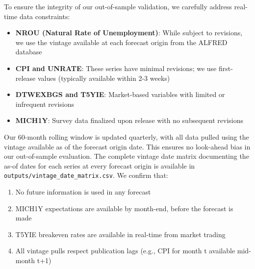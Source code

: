 \documentclass[12pt]{article}
\begin{document}
To ensure the integrity of our out-of-sample validation, we carefully address real-time data constraints:

\begin{itemize}
\item \textbf{NROU (Natural Rate of Unemployment)}: While subject to revisions, we use the vintage available at each forecast origin from the ALFRED database
\item \textbf{CPI and UNRATE}: These series have minimal revisions; we use first-release values (typically available within 2-3 weeks)
\item \textbf{DTWEXBGS and T5YIE}: Market-based variables with limited or infrequent revisions
\item \textbf{MICH1Y}: Survey data finalized upon release with no subsequent revisions
\end{itemize}

Our 60-month rolling window is updated quarterly, with all data pulled using the vintage available as of the forecast origin date. This ensures no look-ahead bias in our out-of-sample evaluation. The complete vintage date matrix documenting the as-of dates for each series at every forecast origin is available in \texttt{outputs/vintage\_date\_matrix.csv}. We confirm that:
\begin{enumerate}
\item No future information is used in any forecast
\item MICH1Y expectations are available by month-end, before the forecast is made
\item T5YIE breakeven rates are available in real-time from market trading
\item All vintage pulls respect publication lags (e.g., CPI for month t available mid-month t+1)
\end{enumerate}
\end{document}
